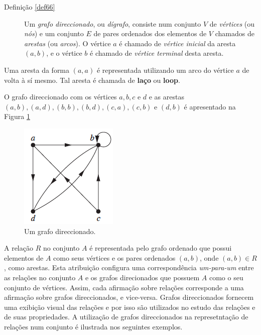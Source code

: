 \begin{description}
	\item[Definição \ref{def66}]{Um \emph{grafo direccionado}, ou \emph{dígrafo},
	consiste num conjunto $V$ de \emph{vértices} (ou \emph{nós}) e um conjunto $E$
	de pares ordenados dos elementos de $V$ chamados de \emph{arestas} (ou
	\emph{arcos}). O vértice $a$ é chamado de \emph{vértice inicial} da aresta
	$(a,b)$, e o vértice $b$ é chamado de \emph{vértice terminal} desta aresta.}
\end{description}

Uma aresta da forma $(a, a)$ é representada utilizando um arco do vértice $a$ de volta à sí mesmo. Tal aresta é chamada de 
\textbf{laço} ou \textbf{loop}.


\begin{description}
	\item[Exemplo \ref{exe613}]{O grafo direccionado com os vértices $a, b, c$ e
	$d$ e as arestas \\$(a,b), (a,d), (b,b), (b,d), (c,a), (c,b)$ e $(d,b)$ é
	apresentado na Figura \ref{Figura63}}
\end{description}

\begin{figure}[H]
	\centering
	\includegraphics[scale=0.6]{chapter/imagens/63}
	\caption{Um grafo direccionado.}
	\label{Figura63}
\end{figure}


A relação $R$ no conjunto $A$ é representada pelo grafo ordenado que possui
elementos de $A$ como seus vértices e os pares ordenados $(a,b)$, onde $(a,b)
\in R$, como arestas. Esta atribuição configura uma correspondência
\emph{um-para-um} entre as relações no conjunto $A$ e os grafos direcionados que
possuem $A$ como o seu conjunto de vértices. Assim, cada afirmação sobre relações corresponde a
uma afirmação sobre grafos direccionados, e vice-versa. Grafos direccionados
fornecem uma exibição visual das relações e por isso são utilizados no estudo
das relações e de suas propriedades. A utilização de grafos direccionados na
represetntação de relações num conjunto é ilustrada nos seguintes exemplos.

